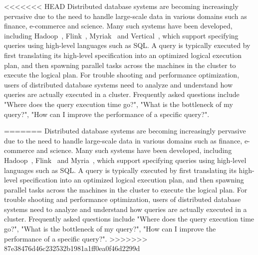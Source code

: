 



<<<<<<< HEAD
Distributed database systems are becoming increasingly pervasive due to the need to handle large-scale data in various domains such as finance, e-commerce and science. Many such systems have been developed, including Hadoop~\cite{hadoop}, Flink~\cite{carbone2015apache}, Myriak~\cite{} and Vertical~\cite{}, which support specifying queries using high-level languages such as SQL. A query is typically executed by first translating its high-level specification into an optimized logical execution plan, and then spawning parallel tasks across the machines in the cluster to execute the logical plan. For trouble shooting and performance optimization, users of distributed database systems need to analyze and understand how queries are actually executed in a cluster. Frequently asked questions include "Where does the query execution time go?", "What is the bottleneck of my query?", "How can I improve the performance of a specific query?".    


=======
Distributed database systems are becoming increasingly pervasive due to the need to handle large-scale data in various domains such as finance, e-commerce and science. Many such systems have been developed, including Hadoop~\cite{hadoop}, Flink~\cite{carbone2015apache} and Myria~\cite{halperin2014demonstration}, which support specifying queries using high-level languages such as SQL. A query is typically executed by first translating its high-level specification into an optimized logical execution plan, and then spawning parallel tasks across the machines in the cluster to execute the logical plan. For trouble shooting and performance optimization, users of distributed database systems need to analyze and understand how queries are actually executed in a cluster. Frequently asked questions include "Where does the query execution time go?", "What is the bottleneck of my query?", "How can I improve the performance of a specific query?".    
>>>>>>> 87e38476d46c232532b1981a1ff0ea0f46d2299d



